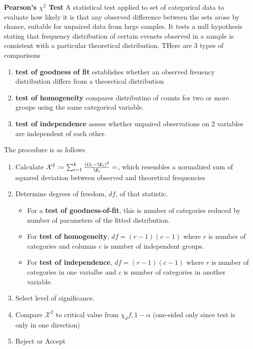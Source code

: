 \documentclass[11pt]{article}
\begin{document}
\begin{defn*}
  \textbf{Pearson's $\chi^2$ Test} A statistical test applied to set of categorical data to evaluate how likely it is that any observed difference between the sets arose by chance, suitable for unpaired data from large samples. It tests a null hypothesis stating that frequency distribution of certain evenets observed in a sample is consistent with a particular theoretical distribution. THere are 3 types of comparisons
  \begin{enumerate}
    \item \textbf{test of goodness of fit} establishes whether an observed freuency distribution differs from a theoretical distribution
    \item \textbf{test of homogeneity} compares distributino of counts for two or more groups using the same categorical variable.
    \item \textbf{test of independence} assess whether unpaired observations on 2 variables are independent of each other.
  \end{enumerate}
  The procedure is as follows
  \begin{enumerate}
    \item Calculate $\mathcal{X}^2 := \sum_{i=1}^k \frac{(O_i - \E_i)^2}{\E_i} = $, which resembles a normalized sum of squared deviation between observed and theoretical frequencies
    \item Determine degrees of freedom, $df$, of that statistic.
    \begin{itemize}
      \item For a \textbf{test of goodness-of-fit}, this is number of categories reduced by number of parameters of the fitted distribution.
      \item For \textbf{test of homogeneity}, $df = (r -1)(c-1)$ where $r$ is number of categories and columns $c$ is number of independent groups.
      \item For \textbf{test of independence}, $df = (r -1)(c-1)$ where $r$ is number of categories in one varialbe and $c$ is number of categories in another variable.
    \end{itemize}
    \item Select level of significance.
    \item Compare $\mathcal{X}^2$ to critical value from $\chi_df, 1-\alpha$ (one-sided only since test is only in one direction)
    \item Reject or Accept
  \end{enumerate}
\end{defn*}
\end{document}
